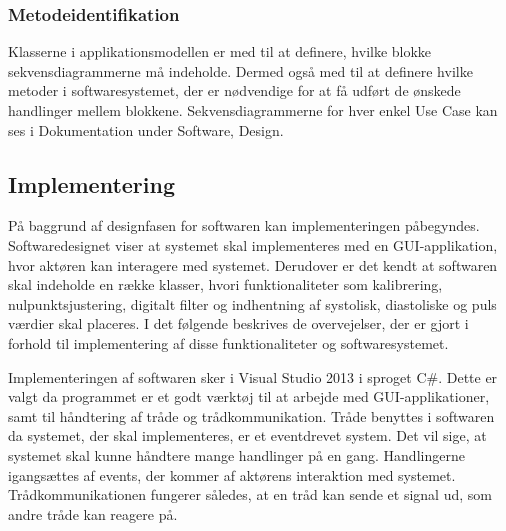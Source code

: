 \subsubsection{Metodeidentifikation}
Klasserne i applikationsmodellen er med til at definere, hvilke blokke sekvensdiagrammerne må indeholde. Dermed også med til at definere hvilke metoder i softwaresystemet, der er nødvendige for at få udført de ønskede handlinger mellem blokkene. Sekvensdiagrammerne for hver enkel Use Case kan ses i Dokumentation under Software, Design. 

\subsection{Implementering}
På baggrund af designfasen for softwaren kan implementeringen påbegyndes. Softwaredesignet viser at systemet skal implementeres med en GUI-applikation, hvor aktøren kan interagere med systemet. Derudover er det kendt at softwaren skal indeholde en række klasser, hvori funktionaliteter som kalibrering, nulpunktsjustering, digitalt filter og indhentning af systolisk, diastoliske og puls værdier skal placeres. I det følgende beskrives de overvejelser, der er gjort i forhold til implementering af disse funktionaliteter og softwaresystemet. 

Implementeringen af softwaren sker i Visual Studio 2013 i sproget C\#. Dette er valgt da programmet er et godt værktøj til at arbejde med GUI-applikationer, samt til håndtering af tråde og trådkommunikation. Tråde benyttes i softwaren da systemet, der skal implementeres, er et eventdrevet system. Det vil sige, at systemet skal kunne håndtere mange handlinger på en gang. Handlingerne igangsættes af events, der kommer af aktørens interaktion med systemet. Trådkommunikationen fungerer således, at en tråd kan sende et signal ud, som andre tråde kan reagere på.

